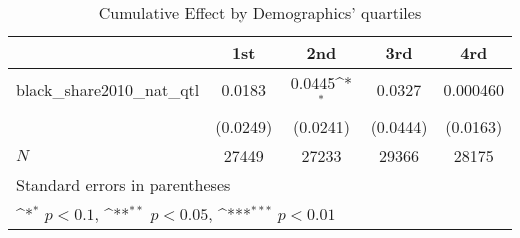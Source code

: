 \begin{table}[htbp]\centering
\def\sym#1{\ifmmode^{#1}\else\(^{#1}\)\fi}
\caption{Cumulative Effect by Demographics' quartiles}
\begin{tabular}{l*{4}{c}}
\hline\hline
            &\multicolumn{1}{c}{1st}&\multicolumn{1}{c}{2nd}&\multicolumn{1}{c}{3rd}&\multicolumn{1}{c}{4rd}\\
\hline
black\_share2010\_nat\_qtl&      0.0183         &      0.0445\sym{*}  &      0.0327         &    0.000460         \\
            &    (0.0249)         &    (0.0241)         &    (0.0444)         &    (0.0163)         \\
\hline
\(N\)       &       27449         &       27233         &       29366         &       28175         \\
\hline\hline
\multicolumn{5}{l}{\footnotesize Standard errors in parentheses}\\
\multicolumn{5}{l}{\footnotesize \sym{*} \(p<0.1\), \sym{**} \(p<0.05\), \sym{***} \(p<0.01\)}\\
\end{tabular}
\end{table}
